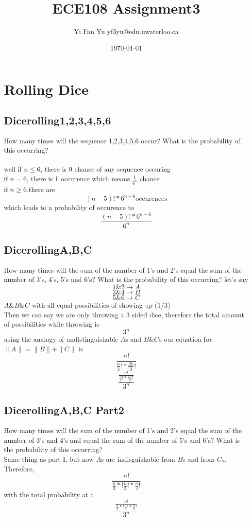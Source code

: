 \documentclass[a4paper,12pt]{article}
\begin{document}
\title{ECE108 Assignment3} \author{Yi Fan Yu yf3yu@edu.uwaterloo.ca} \date{\today}

\maketitle

\tableofcontents
\newpage
\renewcommand\thesubsection{\alph{subsection}}
\section{Rolling Dice}
\subsection{Dicerolling1,2,3,4,5,6}
How many times will the sequence 1,2,3,4,5,6 occur?  What is the
probability of this occurring?\\
\bigskip\\
well if $n \leq 6$, there is 0 chance of any sequence occuring\\
if $n = 6$, there is 1 occurence which means $\frac{1}{6^{6}}$ chance\\
if $n \geq 6$,there are 
  \[(n-5)!*6^{n-6}\text{occurences}\]
  which leads to a probability of occurence to
  \[\frac{(n-5)!*6^{n-6}}{6^{n}}\]

\subsection{DicerollingA,B,C}
How many times will the sum of the number of 1's and 2's equal the
sum of the number of 3's, 4's, 5's and 6's?  What is the probability
of this occurring?
let's say\\
\[ 1 \& 2 \mapsto A\]
\[ 3 \& 4 \mapsto B\]
\[ 5 \& 6 \mapsto C\]
$A \& B \& C$ with all equal possibilities of showing up (1/3)\\
Then we can say we are only throwing a 3 sided dice, therefore the total amount of possibilities while throwing is\\
\[3^n\]
using the analogy of undistinguishable $A$s and $ B\& C$s
our equation for $ \|A\|= \|B\|+\|C\|$
is \\
  \[ \frac{n!}{\frac{n}{3}! * \frac{2n}{3}!}\]
  \[ \frac {\frac{n!}{\frac{n}{3}! * \frac{2n}{3}!}} {3^{n}}\]
\subsection{DicerollingA,B,C Part2}
How many times will the sum of the number of 1's and 2's equal the
sum of the number of 3's and 4's and equal the sum of the number of
5's and 6's?  What is the probability of this occurring?\\
Same thing as part I, but now $A$s are indisguishable from $B$s and from $C$s. Therefore,
  \[\frac{n!}{\frac{n}{3}*!\frac{n}{3}!*\frac{n}{3}!}\]
  with the total probability at :\\
  \[ \frac {\frac{n!}{\frac{n}{3}*!\frac{n}{3}!*\frac{n}{3}!}} {3^{n}}\]
\end{document}
